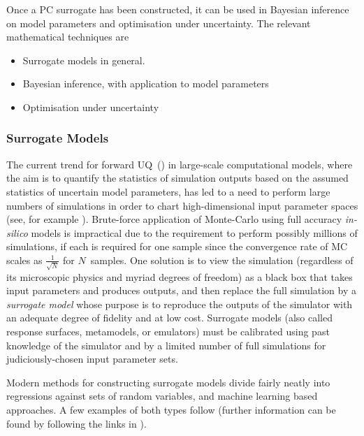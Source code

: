 Once a PC surrogate has been constructed, it can be used in Bayesian inference on
model parameters and optimisation under uncertainty. The relevant mathematical techniques are
\begin{itemize}
\item Surrogate models in general.
\item Bayesian inference, with application to model parameters
\item Optimisation under uncertainty
\end{itemize}


\subsubsection{Surrogate Models}\label{sec:surrogate}

The current trend for forward UQ~() in large-scale computational models, where the aim is to quantify 
the statistics of simulation outputs based on the assumed statistics of uncertain model parameters, 
has led to a need to perform large numbers of simulations in order to chart high-dimensional input 
parameter spaces (see, for example \cite{Su17Surr}).  
Brute-force application of Monte-Carlo using full accuracy {\it in-silico} models is 
impractical due to the requirement to perform possibly millions of simulations, if each
is required for one sample
since the convergence rate of MC scales as $\frac{1}{\sqrt{N}}$ for $N$~samples.
One solution is to view the simulation (regardless of its microscopic physics and myriad degrees of 
freedom) as a black box that takes input parameters and produces outputs, and then replace the full 
simulation by a {\it surrogate model} whose purpose is to reproduce the outputs of 
the simulator with an adequate degree of fidelity and at low cost.  
Surrogate models (also called response surfaces, metamodels, or emulators) must be calibrated using past 
knowledge of the simulator and by a limited number of full simulations for judiciously-chosen input 
parameter sets.

Modern methods for constructing surrogate models divide fairly neatly into regressions against sets 
of random variables, and machine learning based approaches.
A few examples of both types follow (further information can be found by following the links in 
\cite{SMwiki}).

